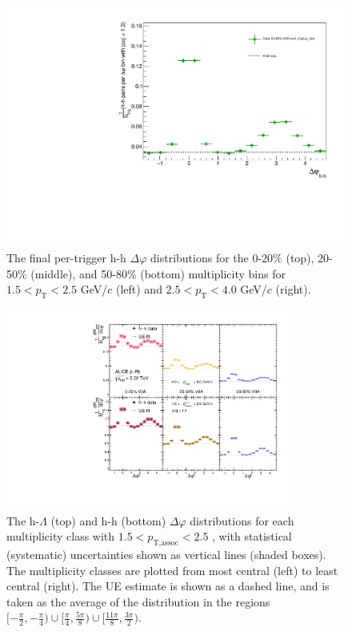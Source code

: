\begin{figure}[ht]
\begin{minipage}{0.48\textwidth}
	\end{minipage}
	\begin{minipage}{0.48\textwidth}
		\includegraphics[width=\textwidth]{figures/analysis/h_h_dphi_avg6_50_80_highpt.pdf}
	\end{minipage}
	\caption{The final per-trigger h-h $\Delta\varphi$ distributions for the 0-20\% (top), 20-50\% (middle), and 50-80\% (bottom) multiplicity bins for $1.5 < p_{\text{T}} < 2.5$ GeV/$c$ (left) and $2.5 < p_{\text{T}} < 4.0$ GeV/$c$ (right).}
	\label{fig:h_h_1d_final}
\end{figure}

\clearpage

\begin{figure}[h!]
\centering
\includegraphics[width=0.83\textwidth]{figures/results/dphi_final_lowpt.pdf}
\caption{The h-$\Lambda$ (top) and h-h (bottom) $\Delta\varphi$ distributions for each multiplicity class with $1.5 < p_{\text{T,assoc}} < 2.5$ \GeVc, with statistical (systematic) uncertainties shown as vertical lines (shaded boxes). The multiplicity classes are plotted from most central (left) to least central (right). The UE estimate is shown as a dashed line, and is taken as the average of the distribution in the regions $[-\frac{\pi}{2}, -\frac{\pi}{4}) \cup [\frac{\pi}{4}, \frac{5\pi}{8}) \cup [\frac{11\pi}{8}, \frac{3\pi}{2})$.}
\label{fig:dphi_final_lowpt}
\end{figure}

